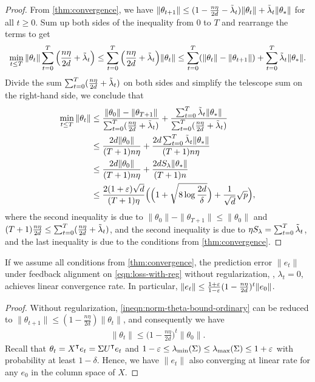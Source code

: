 \begin{proof}
    From \cref{thm:convergence}, we have $\|\theta_{t+1}\| \leq (1-\frac{n\eta}{2d}-\tilde{\lambda}_t)\|\theta_t\| + \tilde{\lambda}_t\|\theta_\ast\|$ for all $t\geq 0$. Sum up both sides of the inequality from $0$ to $T$ and rearrange the terms to get
    \begin{align*}
        \min_{t\leq T} \|\theta_t\|\sum_{t=0}^T \Big(\frac{n\eta}{2d}+\tilde{\lambda}_t\Big) \leq \sum_{t=0}^T \Big(\frac{n\eta}{2d}+\tilde{\lambda}_t\Big)\|\theta_t\| \leq \sum_{t=0}^T (\|\theta_t\|- \|\theta_{t+1}\|) + \sum_{t=0}^T \tilde{\lambda}_t\|\theta_\ast\|.
    \end{align*}
    Divide the sum $\sum_{t=0}^T (\frac{n\eta}{2d}+\tilde{\lambda}_t)$ on both sides and simplify the telescope sum on the right-hand side, we conclude that
    \begin{align*}
        \min_{t\leq T}\|\theta_t\| & \leq \frac{\|\theta_0\| - \|\theta_{T+1}\|}{\sum_{t=0}^T (\frac{n\eta}{2d}+\tilde{\lambda}_t)} + \frac{\sum_{t=0}^T \tilde{\lambda}_t\|\theta_\ast\|}{\sum_{t=0}^T (\frac{n\eta}{2d}+\tilde{\lambda}_t)} \\
        & \leq \frac{2d\|\theta_0\|}{(T+1)n\eta} + \frac{2d\sum_{t=0}^T \tilde{\lambda}_t\|\theta_\ast\|}{(T+1)n\eta} \\
        & \leq \frac{2d\|\theta_0\|}{(T+1)n\eta} + \frac{2d S_\lambda\|\theta_\ast\|}{(T+1)n} \\
        & \leq \frac{2(1+\varepsilon)\sqrt{d}}{(T+1)\eta} \Big( \Big(1 + \sqrt{8\log\frac{2d}{\delta}}\Big) + \frac{1}{\sqrt{d}}\sqrt{p} \Big),
    \end{align*}
    where the second inequality is due to $\|\theta_0\| - \|\theta_{T+1}\| \leq \|\theta_0\|$ and $(T+1)\frac{n\eta}{2d} \leq \sum_{t=0}^T (\frac{n\eta}{2d}+\tilde{\lambda}_t)$, and the second inequality is due to $\eta S_\lambda = \sum_{t=0}^T \tilde{\lambda}_t$, and the last inequality is due to the conditions from \cref{thm:convergence}.
\end{proof}

\begin{corollary}\label{cor:convergence-without-reg}
    If we assume all conditions from \cref{thm:convergence}, the prediction error $\|e_t\|$ under feedback alignment on \eqref{eqn:loss-with-reg} without regularization, \ie, $\lambda_t = 0$, achieves linear convergence rate. In particular, $\|e_t\| \leq \frac{1+\varepsilon}{1-\varepsilon}(1-\frac{n\eta}{2d})^t \|e_0\|$.
\end{corollary}

\begin{proof}
    Without regularization, \cref{ineqn:norm-theta-bound-ordinary} can be reduced to $\|\theta_{t+1}\| \leq (1-\frac{n\eta}{2d}) \|\theta_t\|$, and consequently we have
    \begin{align*}
        \|\theta_t\| \leq \Big(1-\frac{n\eta}{2d}\Big)^t \|\theta_0\|.
    \end{align*}
    Recall that $\theta_t = X\transpose e_t = \Sigma U\transpose e_t$ and $1-\varepsilon\leq \lambda_{\mathrm{min}}(\Sigma)\leq \lambda_{\mathrm{max}}(\Sigma)\leq 1+\varepsilon$ with probability at least $1-\delta$. Hence, we have $\|e_t\|$ also converging at linear rate for any $e_0$ in the column space of $X$.
\end{proof}

